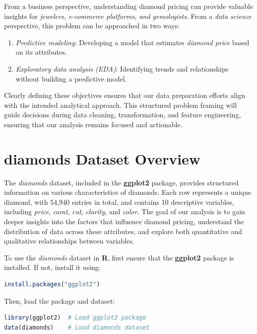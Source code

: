 \documentclass[
]{book}
\providecommand{\tightlist}{%
  \setlength{\itemsep}{0pt}\setlength{\parskip}{0pt}}
\theoremstyle{definition}
\theoremstyle{definition}
\theoremstyle{definition}
\theoremstyle{definition}
\theoremstyle{remark}
\begin{document}
From a business perspective, understanding diamond pricing can provide valuable insights for \emph{jewelers, e-commerce platforms, and gemologists}. From a \emph{data science} perspective, this problem can be approached in two ways:

\begin{enumerate}
\def\labelenumi{\arabic{enumi}.}
\tightlist
\item
  \emph{Predictive modeling}: Developing a model that estimates \emph{diamond price} based on its attributes.\\
\item
  \emph{Exploratory data analysis (EDA)}: Identifying trends and relationships without building a predictive model.
\end{enumerate}

Clearly defining these objectives ensures that our data preparation efforts align with the intended analytical approach. This structured problem framing will guide decisions during data cleaning, transformation, and feature engineering, ensuring that our analysis remains focused and actionable.

\section{diamonds Dataset Overview}\label{diamonds-dataset-overview}

The \emph{diamonds} dataset, included in the \textbf{ggplot2} package, provides structured information on various characteristics of diamonds. Each row represents a unique diamond, with 54,940 entries in total, and contains 10 descriptive variables, including \emph{price}, \emph{carat}, \emph{cut}, \emph{clarity}, and \emph{color}. The goal of our analysis is to gain deeper insights into the factors that influence diamond pricing, understand the distribution of data across these attributes, and explore both quantitative and qualitative relationships between variables.

To use the \emph{diamonds} dataset in \textbf{R}, first ensure that the \textbf{ggplot2} package is installed. If not, install it using:

\begin{lstlisting}[language=R]
install.packages("ggplot2") 
\end{lstlisting}

Then, load the package and dataset:

\begin{lstlisting}[language=R]
library(ggplot2)  # Load ggplot2 package
data(diamonds)    # Load diamonds dataset
\end{lstlisting}
\end{document}
